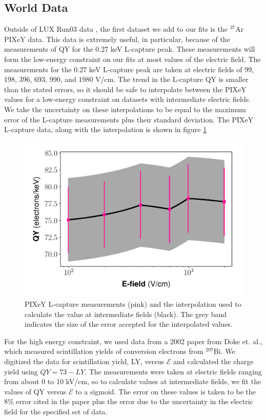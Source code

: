 \subsection{World Data}
Outside of LUX Run03 data \cite{lux_tritium,Evanyields,DQyields}, the first dataset we add to our fits is the $^{37}$Ar PIXeY data\cite{pixey_ar37}. This data is extremely useful, in particular, because of the measurements of QY for the 0.27 keV L-capture peak. These measurements will form the low-energy constraint on our fits at most values of the electric field. The measurements for the 0.27 keV L-capture peak are taken at electric fields of 99, 198, 396, 693, 990, and 1980 V/cm. The trend in the L-capture QY is smaller than the stated errors, so it should be safe to interpolate between the PIXeY values for a low-energy constraint on datasets with intermediate electric fields. We take the uncertainty on these interpolations to be equal to the maximum error of the L-capture measurements plus their standard deviation. The PIXeY L-capture data, along with the interpolation is shown in figure \ref{fig:pixey_interp}
\begin{figure}[!h]
\centering
  \includegraphics[width=\textwidth]{Figures/Yields_fit_new/PIXeY_interp.pdf}
\caption{PIXeY L-capture measurements (pink) and the interpolation used to calculate the value at intermediate fields (black). The grey band indicates the size of the error accepted for the interpolated values.}
\label{fig:pixey_interp}
\end{figure}

For the high energy constraint, we used data from a 2002 paper from Doke et. al., which measured scintillation yields of conversion electrons from $^{207}$Bi\cite{doke2002}. We digitized the data for scintillation yield, LY, versus $\mathcal{E}$ and calculated the charge yield using $QY=73-LY$. The measurements were taken at electric fields ranging from about 0 to 10 kV/cm, so to calculate values at intermediate fields, we fit the values of QY versus $\mathcal{E}$ to a sigmoid. The error on these values is taken to be the 8\% error cited in the paper plus the error due to the uncertainty in the electric field for the specified set of data.

